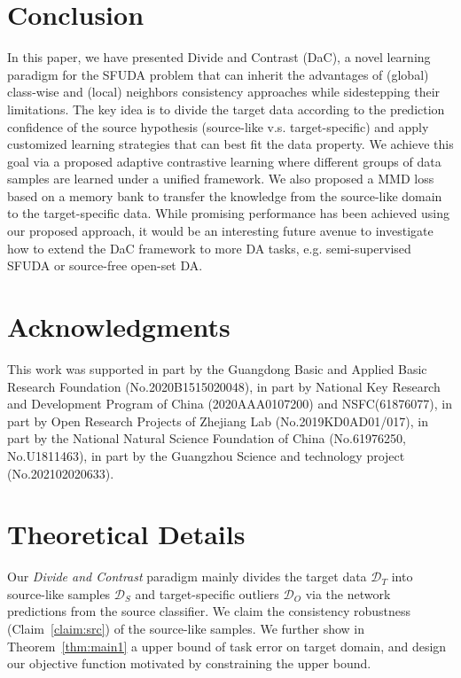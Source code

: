 \documentclass{article}
\newcommand{\modelName}{DaC}
\newcommand{\methodName}{Divide and Contrast}
\begin{document}
\section{Conclusion}

In this paper, we have presented \methodName{} (\modelName{}), a novel learning paradigm for the SFUDA problem that can inherit the advantages of (global) class-wise and (local) neighbors consistency approaches while sidestepping their limitations. The key idea is to divide the target data according to the prediction confidence of the source hypothesis (source-like v.s. target-specific) and apply customized learning strategies that can best fit the data property. 
We achieve this goal via a proposed adaptive contrastive learning where different groups of data samples are learned under a unified framework.
We also proposed a MMD loss based on a memory bank to transfer the knowledge from the source-like domain to the target-specific data.
While promising performance has been achieved using our proposed approach, it would be an interesting future avenue to investigate how to extend the \modelName{} framework to more DA tasks, e.g. semi-supervised SFUDA or source-free open-set DA.

\section{Acknowledgments}
This work was supported in part by the Guangdong Basic and Applied Basic Research Foundation (No.2020B1515020048), in part by National Key Research and Development Program of China (2020AAA0107200) and
NSFC(61876077), in part by Open Research Projects of Zhejiang Lab (No.2019KD0AD01/017), in part by the National Natural Science Foundation of China (No.61976250, No.U1811463), in part by the Guangzhou Science and technology project (No.202102020633).











\newpage
\appendix


\section{Theoretical Details}\label{supple_proof}
Our \textit{Divide and Contrast} paradigm mainly divides the target data $\mathcal{D}_T$ into source-like samples $\mathcal{D}_S$ and target-specific outliers $\mathcal{D}_O$ via the network predictions from the source classifier. We claim the consistency robustness (Claim~\ref{claim:src}) of the source-like samples. We further show in Theorem~\ref{thm:main1} a upper bound of task error on target domain, and design our objective function motivated by constraining the upper bound.
\end{document}
